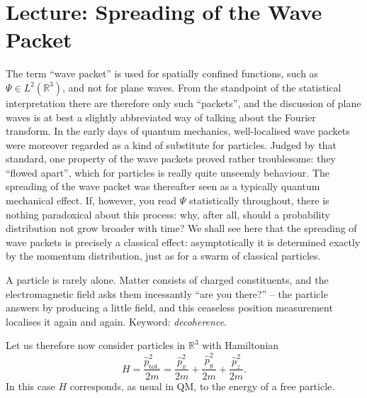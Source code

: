 

\section{Lecture: Spreading of the Wave Packet}
The term ``wave packet'' is used for spatially confined functions, such as $\Psi\in L^2(\mathbb{R}^3)$, and not for plane waves. From the standpoint of the statistical interpretation there are therefore only such ``packets'', and the discussion of plane waves is at best a slightly abbreviated way of talking about the Fourier transform. In the early days of quantum mechanics, well-localised wave packets were moreover regarded as a kind of substitute for particles. Judged by that
standard, one property of the wave packets proved rather troublesome: they ``flowed apart'', which for particles is really quite unseemly behaviour. The spreading of the wave packet was thereafter seen as a typically quantum mechanical effect. If, however, you read $\Psi$ statistically throughout, there is nothing paradoxical about this process: why, after all, should a probability distribution
not grow broader with time? We shall see here that the spreading of wave packets is precisely a classical effect: asymptotically it is determined exactly by the momentum distribution, just as for a swarm of classical particles.

\begin{greybox}
	A particle is rarely alone. Matter consists of charged constituents, and the electromagnetic field asks them incessantly ``are you there?'' -- the particle answers by producing a little field, and this ceaseless position measurement localises it again and again. Keyword: \emph{decoherence}.
\end{greybox}

Let us therefore now consider particles in $\mathbb{R}^3$ with Hamiltonian
\begin{equation}
	H = \frac{\widehat{p}_\text{tot.}^2}{2m} = \frac{\widehat{p}_{x}^2}{2m}+\frac{\widehat{p}_{y}^2}{2m}+\frac{\widehat{p}_{z}^2}{2m}.
\end{equation}
In this case $H$ corresponds, as usual in QM, to the energy of a free particle. 

